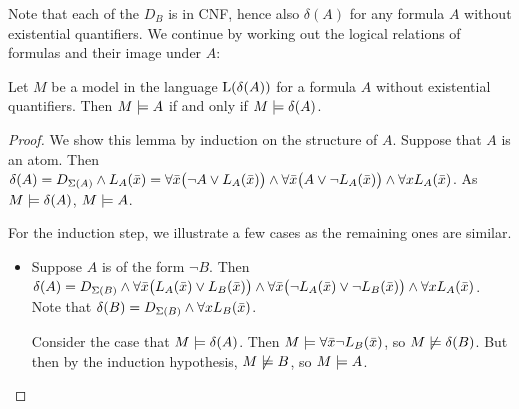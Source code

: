 Note that each of the $D_B$ is in CNF, hence also $\delta(A)$ for any formula $A$ without existential quantifiers.
We continue by working out the logical relations of formulas and their image under $A$:

\begin{lemma}
	Let $M$ be a model in the language $\operatorname{L}(\delta(A))$ for a formula $A$ without existential quantifiers. Then $M \models A$ if and only if $M \models \delta(A)$.
\end{lemma}
\begin{proof}
	We show this lemma by induction on the structure of $A$.
	Suppose that $A$ is an atom. Then $\delta(A) = D_{\Sigma(A)} \land L_A(\bar x) =\allowbreak \forall \bar x \big(\lnot A \lor L_A(\bar x)\big) \land\allowbreak \forall \bar x \big(A \lor \lnot L_A(\bar x)\big) \land \forall x L_A(\bar x) $.
	As $M \models \delta(A)$, $M \models A$.

	For the induction step, we illustrate a few cases as the remaining ones are similar.
	\begin{itemize}
		\item Suppose $A$ is of the form $\lnot B$. 
			Then $\delta(A) = D_{\Sigma(B)} \land  
			\forall \bar x \big(L_A(\bar x) \lor L_B(\bar x)\big) \land \forall \bar x \big(\lnot L_A(\bar x) \lor \lnot L_B(\bar x)\big)
			\land \forall x L_A(\bar x)$. 
			Note that $\delta(B) =  D_{\Sigma(B)} \land \forall x L_B(\bar x)$.


			Consider the case that $M \models \delta(A)$. Then $M \models \forall \bar x \lnot L_B(\bar x)$, so $M \not\models \delta(B)$. 
			But then by the induction hypothesis, $M \not\models B$, so $M\models A$.


	\end{itemize}
\end{proof}

